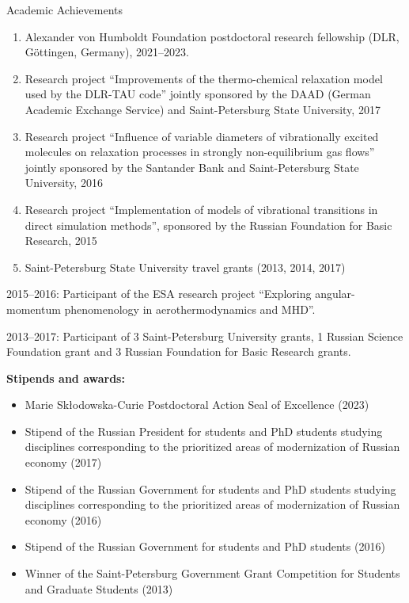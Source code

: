\documentclass{resume} %
\begin{document}
\begin{rSection}{Academic Achievements}
\begin{enumerate}
    \item Alexander von Humboldt Foundation postdoctoral research fellowship (DLR,  G\"{o}ttingen, Germany), 2021--2023.
    \item Research project ``Improvements of the thermo-chemical relaxation model used by the DLR-TAU code'' jointly sponsored by the DAAD (German Academic Exchange Service) and Saint-Petersburg State University, 2017
    \item Research project ``Influence of variable diameters of vibrationally excited molecules on relaxation processes in strongly non-equilibrium gas flows'' jointly sponsored by the Santander Bank and Saint-Petersburg State University, 2016
    \item Research project ``Implementation of models of vibrational transitions in direct simulation methods'', sponsored by the Russian Foundation for Basic Research, 2015
    \item Saint-Petersburg State University travel grants (2013, 2014, 2017)

\end{enumerate}


2015--2016: Participant of the ESA research project ``Exploring angular-momentum phenomenology in aerothermodynamics and MHD''.

2013--2017: Participant of 3 Saint-Petersburg University grants, 1 Russian Science Foundation grant and 3 Russian Foundation for Basic Research grants.

{\bf Stipends and awards:}
\begin{itemize}
    \item Marie Sk\l{}odowska-Curie Postdoctoral Action Seal of Excellence (2023)
    \item Stipend of the Russian President for students and PhD students studying disciplines corresponding to the prioritized areas of modernization of Russian economy (2017)
    \item Stipend of the Russian Government for students and PhD students studying disciplines corresponding to the prioritized areas of modernization of Russian economy (2016)
    \item Stipend of the Russian Government for students and PhD students (2016)
    \item Winner of the Saint-Petersburg Government Grant Competition for Students and Graduate Students (2013)
\end{itemize}
\end{rSection}

\newpage
\end{document}
